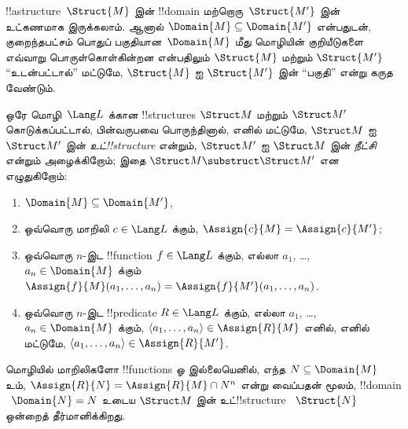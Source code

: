 \documentclass[../../../include/open-logic-section]{subfiles}
\begin{document}


!!a{structure}~$\Struct{M}$ இன் !!{domain} மற்றொரு~$\Struct{M'}$
இன் உட்கணமாக இருக்கலாம். ஆனால் $\Domain{M} \subseteq \Domain{M'}$
என்பதுடன், குறைந்தபட்சம் பொதுப் பகுதியான~$\Domain{M}$ மீது மொழியின்
குறியீடுகளை எவ்வாறு பொருள்கொள்கின்றன என்பதிலும் $\Struct{M}$ மற்றும்
$\Struct{M'}$ ``உடன்பட்டால்'' மட்டுமே, $\Struct{M}$ ஐ
$\Struct{M'}$ இன் ``பகுதி'' என்று கருத வேண்டும்.

\begin{defn}
ஒரே மொழி~$\Lang L$ க்கான !!{structure}s $\Struct M$ மற்றும்
$\Struct M'$ கொடுக்கப்பட்டால், பின்வருபவை பொருந்தினால், எனில் மட்டுமே,
$\Struct M$ ஐ $\Struct M'$ இன் \emph{உட்!!{structure}} என்றும்,
$\Struct M'$ ஐ $\Struct M$ இன் \emph{நீட்சி} என்றும் அழைக்கிறோம்;
இதை $\Struct M \substruct \Struct M'$ என எழுதுகிறோம்:
\begin{enumerate}
\item $\Domain{M} \subseteq \Domain{M'}$,
\item ஒவ்வொரு மாறிலி $c \in \Lang L$ க்கும், $\Assign{c}{M} =
    \Assign{c}{M'}$;
\item ஒவ்வொரு $n$-இட !!{function} $f \in \Lang L$ க்கும்,
  எல்லா $a_1$, \dots, $a_n \in \Domain{M}$ க்கும்
  $\Assign{f}{M}(a_1, \dots, a_n) = \Assign{f}{M'}(a_1, \dots, a_n)$.
\item ஒவ்வொரு $n$-இட !!{predicate} $R \in \Lang L$ க்கும்,
  எல்லா $a_1$, \dots, $a_n \in \Domain{M}$ க்கும், $\langle
  a_1, \dots, a_n\rangle \in \Assign{R}{M}$ எனில், எனில் மட்டுமே,
  $\langle a_1, \dots, a_n\rangle \in \Assign{R}{M'}$.
\end{enumerate}
\end{defn}

\begin{rem}
மொழியில் மாறிலிகளோ !!{function}s ஓ இல்லையெனில், எந்த $N
\subseteq \Domain{M}$ உம், $\Assign{R}{N} =
\Assign{R}{M} \cap N^n$ என்று வைப்பதன் மூலம், !!{domain}
~$\Domain{N} = N$ உடைய $\Struct M$ இன் உட்!!{structure}
~$\Struct{N}$ ஒன்றைத் தீர்மானிக்கிறது.
\end{rem}

\end{document}
